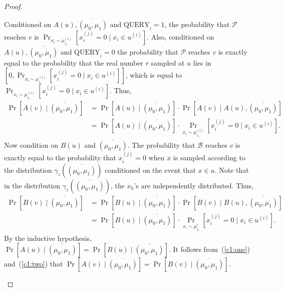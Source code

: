\documentclass[11pt]{article}
\numberwithin{equation}{section}
\theoremstyle{definition}
\theoremstyle{plain}
\newcommand{\q}{\text{QUERY}}
\newcommand{\clB}{\mathcal{B}}
\newcommand{\clP}{\mathcal{P}}
\begin{document}
\begin{proof}
\begin{description}
\begin{itemize}
Conditioned on $A(u), \overline{(\mu_0,\mu_1)}$ and $\q_i=1$, the probability that $\clP$ reaches $v$ is $\Pr_{x_i \sim \mu_{z_i}^{(i)}}[x_i^{(j)}=0 \mid x_i \in u^{(i)}]$. Also, conditioned on $A(u),\overline{(\mu_0,\mu_1)}$ and 
$\q_i=0$ the probability that $\clP$ reaches $v$ is exactly equal to the probability that the real number $r$ sampled at $u$ lies in $[0, \Pr_{x_i \sim \mu_{z_i}^{(i)}}[x_i^{(j)}=0 \mid x_i \in u^{(i)}] ]$, which is equal to 
$\Pr_{x_i \sim \mu_{z_i}^{(i)}}[x_i^{(j)}=0 \mid x_i \in u^{(i)}]$. Thus,
\begin{align}
\Pr[A(v) \mid \overline{(\mu_0,\mu_1)}]&=\Pr[A(u) \mid \overline{(\mu_0,\mu_1)}] \cdot \Pr[A(v) \mid A(u), \overline{(\mu_0,\mu_1)}] \nonumber \\
&=\Pr[A(u) \mid \overline{(\mu_0,\mu_1)}] \cdot \Pr_{x_i \sim \mu_{z_i}^{(i)}}[x_i^{(j)}=0 \mid x_i \in u^{(i)}]. \label{c1:one}
\end{align}
Now condition on $B(u)$ and $\overline{(\mu_0,\mu_1)}$. The probability that $\clB$ reaches $v$ is exactly equal to the probability that $x_i^{(j)}=0$ when $x$ is sampled according to the distribution 
$\gamma_z(\overline{(\mu_0,\mu_1)})$ conditioned on the event that $x \in u$. Note that in the distribution $\gamma_z(\overline{(\mu_0,\mu_1)})$, the $x_k$'s are independently distributed. Thus,
\begin{align}
\Pr[B(v) \mid \overline{(\mu_0,\mu_1)}]&=\Pr[B(u) \mid \overline{(\mu_0,\mu_1)}] \cdot \Pr[B(v) \mid B(u),\overline{(\mu_0,\mu_1)}] \nonumber \\
&=\Pr[B(u) \mid \overline{(\mu_0,\mu_1)}] \cdot \Pr_{x_i \sim \mu_{z_i}^i}[x_i^{(j)}=0 \mid x_i \in u^{(i)}]. \label{c1:two}
\end{align}
By the inductive hypothesis, $\Pr[A(u) \mid \overline{(\mu_0,\mu_1)}]=\Pr[B(u) \mid \overline{(\mu_0,\mu_1)}]$. It follows from~(\ref{c1:one}) and~(\ref{c1:two}) that 
$\Pr[A(v) \mid \overline{(\mu_0,\mu_1)}]=\Pr[B(v) \mid \overline{(\mu_0,\mu_1)}]$.


\end{itemize}
\end{description}
\end{proof}
\end{document}
